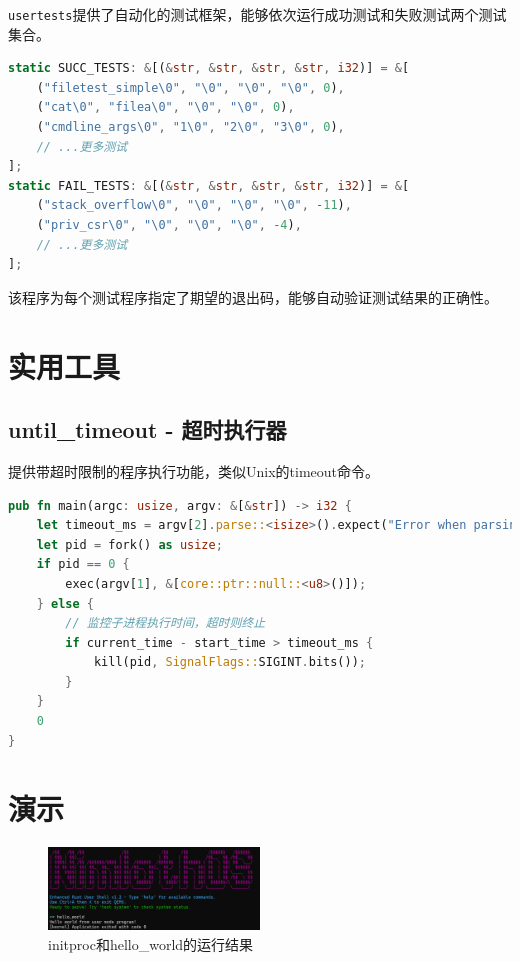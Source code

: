 \texttt{usertests}提供了自动化的测试框架，能够依次运行成功测试和失败测试两个测试集合。

\begin{lstlisting}[language=Rust]
static SUCC_TESTS: &[(&str, &str, &str, &str, i32)] = &[
    ("filetest_simple\0", "\0", "\0", "\0", 0),
    ("cat\0", "filea\0", "\0", "\0", 0),
    ("cmdline_args\0", "1\0", "2\0", "3\0", 0),
    // ...更多测试
];
static FAIL_TESTS: &[(&str, &str, &str, &str, i32)] = &[
    ("stack_overflow\0", "\0", "\0", "\0", -11),
    ("priv_csr\0", "\0", "\0", "\0", -4),
    // ...更多测试
];
\end{lstlisting}

该程序为每个测试程序指定了期望的退出码，能够自动验证测试结果的正确性。

\section{实用工具}

\subsection{until\_timeout - 超时执行器}

提供带超时限制的程序执行功能，类似Unix的timeout命令。

\begin{lstlisting}[language=Rust]
pub fn main(argc: usize, argv: &[&str]) -> i32 {
    let timeout_ms = argv[2].parse::<isize>().expect("Error when parsing timeout!");
    let pid = fork() as usize;
    if pid == 0 {
        exec(argv[1], &[core::ptr::null::<u8>()]);
    } else {
        // 监控子进程执行时间，超时则终止
        if current_time - start_time > timeout_ms {
            kill(pid, SignalFlags::SIGINT.bits());
        }
    }
    0
}
\end{lstlisting}

\section{演示}

\begin{figure}[htbp]
    \centering
    \includegraphics[width=0.5\textwidth]{../image/init_and_helloworld.png}
    \caption{initproc和hello\_world的运行结果}
    \label{fig:init_and_helloworld}
\end{figure}

